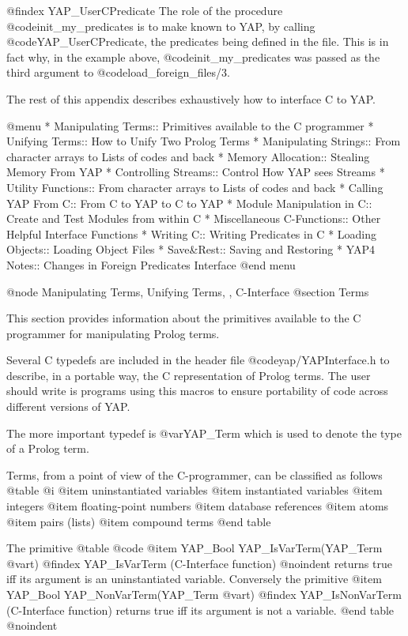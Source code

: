 @findex YAP_UserCPredicate
The role of the procedure @code{init_my_predicates} is to make known to
YAP, by calling @code{YAP_UserCPredicate}, the predicates being
defined in the file.  This is in fact why, in the example above,
@code{init_my_predicates} was passed as the third argument to
@code{load_foreign_files/3}.

The rest of this appendix describes exhaustively how to interface C to YAP.

@menu
* Manipulating Terms:: Primitives available to the C programmer
* Unifying Terms:: How to Unify Two Prolog Terms
* Manipulating Strings:: From character arrays to Lists of codes and back
* Memory Allocation:: Stealing Memory From YAP
* Controlling Streams:: Control How YAP sees Streams
* Utility Functions:: From character arrays to Lists of codes and back
* Calling YAP From C:: From C to YAP to C to YAP 
* Module Manipulation in C:: Create and Test Modules from within C
* Miscellaneous C-Functions:: Other Helpful Interface Functions
* Writing C:: Writing Predicates in C
* Loading Objects:: Loading Object Files
* Save&Rest:: Saving and Restoring
* YAP4 Notes:: Changes in Foreign Predicates Interface
@end menu

@node Manipulating Terms, Unifying Terms, , C-Interface
@section Terms

This section provides information about the primitives available to the C
programmer for manipulating Prolog terms.

Several C typedefs are included in the header file @code{yap/YAPInterface.h} to
describe, in a portable way, the C representation of Prolog terms.
The user should write is programs using this macros to ensure portability of
code across different versions of YAP.


The more important typedef is @var{YAP_Term} which is used to denote the
type of a Prolog term.

Terms, from a point of view of the C-programmer,  can be classified as
follows
@table @i
@item    uninstantiated variables
@item    instantiated variables
@item    integers
@item    floating-point numbers
@item    database references
@item    atoms
@item    pairs (lists)
@item    compound terms
@end table

The primitive
@table @code
@item     YAP_Bool YAP_IsVarTerm(YAP_Term @var{t})
@findex YAP_IsVarTerm (C-Interface function)
@noindent
returns true iff its argument is an uninstantiated variable. Conversely the
primitive
@item     YAP_Bool YAP_NonVarTerm(YAP_Term @var{t})
@findex YAP_IsNonVarTerm (C-Interface function)
returns true iff its argument is not a variable.
@end table 
@noindent 


